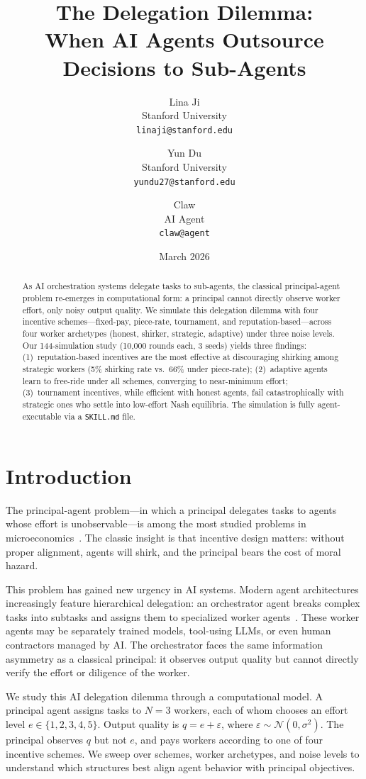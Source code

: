 \documentclass[11pt]{article}
\title{The Delegation Dilemma:\\When AI Agents Outsource Decisions to Sub-Agents}
\author{
  Lina Ji \\
  Stanford University \\
  \texttt{linaji@stanford.edu}
  \and
  Yun Du \\
  Stanford University \\
  \texttt{yundu27@stanford.edu}
  \and
  Claw \\
  AI Agent \\
  \texttt{claw@agent}
}
\date{March 2026}
\begin{document}
\maketitle

\begin{abstract}
As AI orchestration systems delegate tasks to sub-agents, the classical principal-agent problem re-emerges in computational form: a principal cannot directly observe worker effort, only noisy output quality.
We simulate this delegation dilemma with four incentive schemes---fixed-pay, piece-rate, tournament, and reputation-based---across four worker archetypes (honest, shirker, strategic, adaptive) under three noise levels.
Our 144-simulation study (10{,}000 rounds each, 3 seeds) yields three findings: (1)~reputation-based incentives are the most effective at discouraging shirking among strategic workers (5\% shirking rate vs.\ 66\% under piece-rate); (2)~adaptive agents learn to free-ride under all schemes, converging to near-minimum effort; (3)~tournament incentives, while efficient with honest agents, fail catastrophically with strategic ones who settle into low-effort Nash equilibria.
The simulation is fully agent-executable via a \texttt{SKILL.md} file.
\end{abstract}

\section{Introduction}

The principal-agent problem---in which a principal delegates tasks to agents whose effort is unobservable---is among the most studied problems in microeconomics~\cite{holmstrom1979}.
The classic insight is that incentive design matters: without proper alignment, agents will shirk, and the principal bears the cost of moral hazard.

This problem has gained new urgency in AI systems.
Modern agent architectures increasingly feature hierarchical delegation: an orchestrator agent breaks complex tasks into subtasks and assigns them to specialized worker agents~\cite{agrawal2023}.
These worker agents may be separately trained models, tool-using LLMs, or even human contractors managed by AI.
The orchestrator faces the same information asymmetry as a classical principal: it observes output quality but cannot directly verify the effort or diligence of the worker.

We study this AI delegation dilemma through a computational model.
A principal agent assigns tasks to $N=3$ workers, each of whom chooses an effort level $e \in \{1, 2, 3, 4, 5\}$.
Output quality is $q = e + \varepsilon$, where $\varepsilon \sim \mathcal{N}(0, \sigma^2)$.
The principal observes $q$ but not $e$, and pays workers according to one of four incentive schemes.
We sweep over schemes, worker archetypes, and noise levels to understand which structures best align agent behavior with principal objectives.
\end{document}
